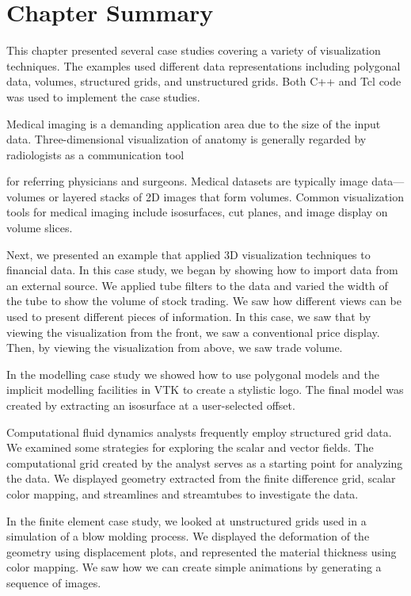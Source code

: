 \section{Chapter Summary}

This chapter presented several case studies covering a variety of visualization techniques. The examples used different data representations including polygonal data, volumes, structured grids, and unstructured grids. Both C++ and Tcl code was used to implement the case studies.

Medical imaging is a demanding application area due to the size of the input data. Three-dimensional visualization of anatomy is generally regarded by radiologists as a communication tool

for referring physicians and surgeons. Medical datasets are typically
image data---volumes or layered stacks of 2D images that form volumes. Common visualization tools for medical imaging include isosurfaces, cut planes, and image display on volume slices.

Next, we presented an example that applied 3D visualization techniques to financial data. In this case study, we began by showing how to import data from an external source. We applied tube filters to the data and varied the width of the tube to show the volume of stock trading. We saw how different views can be used to present different pieces of information. In this case, we saw that by viewing the visualization from the front, we saw a conventional price display. Then, by viewing the visualization from above, we saw trade volume.

In the modelling case study we showed how to use polygonal models and the implicit modelling facilities in VTK to create a stylistic logo. The final model was created by extracting an isosurface at a user-selected offset.

Computational fluid dynamics analysts frequently employ structured grid data. We examined some strategies for exploring the scalar and vector fields. The computational grid created by the analyst serves as a starting point for analyzing the data. We displayed geometry extracted from the finite difference grid, scalar color mapping, and streamlines and streamtubes to investigate the data.

In the finite element case study, we looked at unstructured grids used in a simulation of a blow molding process. We displayed the deformation of the geometry using displacement plots, and represented the material thickness using color mapping. We saw how we can create simple animations by generating a sequence of images.

